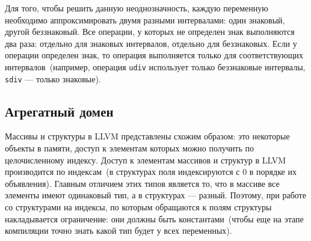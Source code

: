 Для того, чтобы решить данную неоднозначность, каждую переменную необходимо
аппроксимировать двумя разными интервалами: один знаковый, другой беззнаковый.
Все операции, у которых не определен знак выполняются два раза: отдельно для
знаковых интервалов, отдельно для беззнаковых. Если у операции определен знак,
то операция выполняется только для соответствующих интервалов~(например, 
операция \texttt{udiv} использует только беззнаковые интервалы, 
\texttt{sdiv} --- только знаковые).

\subsection{Агрегатный домен}
Массивы и структуры в LLVM представлены схожим образом: это некоторые объекты 
в памяти, доступ к элементам которых можно получить по целочисленному индексу.
Доступ к элементам массивов и структур в LLVM производится по индексам~(в 
структурах поля индексируются с 0 в порядке их объявления). Главным отличием 
этих типов является то, что в массиве все элементы имеют одинаковый тип, а в 
структурах --- разный. Поэтому, при работе со структурами на индексы, по 
которым обращаются к полям структуры накладывается ограничение: они должны 
быть константами~(чтобы еще на этапе компиляции точно знать какой тип будет у 
всех переменных).


